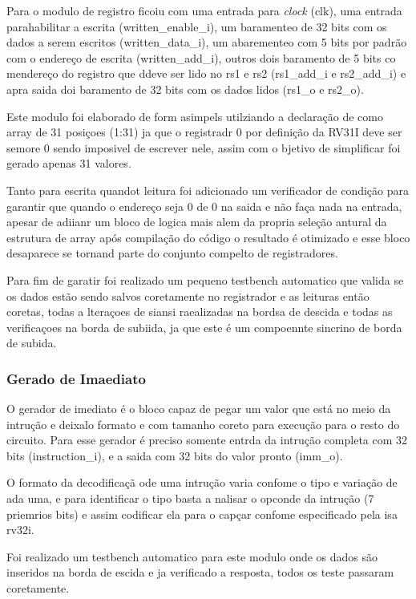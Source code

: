Para o modulo de registro ficoiu com uma entrada para \textit{clock} (clk), uma entrada parahabilitar a escrita (written_enable_i), um baramenteo de 32 bits com os dados a serem escritos (written_data_i), um abarementeo com 5 bits por padrão com o endereço de escrita (written_add_i), outros dois baramento de 5 bits co mendereço do registro que ddeve ser lido no rs1 e rs2 (rs1_add_i e rs2_add_i) e apra saida doi baramento de 32 bits com os dados lidos (rs1_o e rs2_o).

Este modulo foi elaborado de form asimpels utilziando a declaração de como array de 31 posiçoes (1:31) ja que o registradr 0 por definição da RV31I deve ser semore 0 sendo imposivel de escrever nele, assim com o bjetivo de simplificar foi gerado apenas 31 valores.

Tanto para escrita quandot leitura foi adicionado um verificador de condição para garantir que quando o endereço seja 0 de 0 na saida e não faça nada na entrada, apesar de adiianr um bloco de logica mais alem da propria seleção antural da estrutura de array após compilação do código o resultado é otimizado e esse bloco desaparece se tornand parte do conjunto compelto de registradores.

Para fim de garatir foi realizado um pequeno testbench automatico que valida se os dados estão sendo salvos coretamente no registrador e as leituras então coretas, todas a lteraçoes de siansi raealizadas na bordsa de descida e todas as verificaçoes na borda de subiida, ja que este é um compoennte sincrino de borda de subida. 

\subsubsection{Gerado de Imaediato}
\label{subsub:imm_gen}


O gerador de imediato é o bloco capaz de pegar um valor que está no meio da intrução e deixalo formato e com tamanho coreto para execução para o resto do circuito. Para esse gerador é preciso somente entrda da intrução completa com 32 bits (instruction_i), e a saida com 32 bits do valor pronto (imm_o).

O formato da decodificaçã ode uma intrução varia confome o tipo e variação de ada uma, e para identificar o tipo basta a nalisar o opconde da intrução (7 priemrios bits) e assim codificar ela para o capçar confome especificado pela isa rv32i.

Foi realizado um testbench automatico para este modulo onde os dados são inseridos na borda de escida e ja verificado a resposta, todos os teste passaram coretamente.

